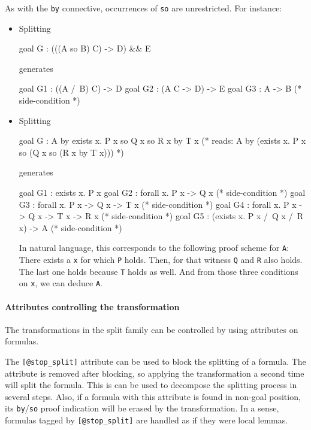 \begin{description}
As with the \texttt{by} connective, occurrences of \texttt{so} are
unrestricted. For instance:
\begin{itemize}
\item Splitting
\begin{whycode}
goal G : (((A so B) \/ C) -> D) && E
\end{whycode}
generates
\begin{whycode}
goal G1 : ((A /\ B) \/ C) -> D
goal G2 : (A \/ C -> D) -> E
goal G3 : A -> B               (* side-condition *)
\end{whycode}
\item Splitting
\begin{whycode}
goal G : A by exists x. P x so Q x so R x by T x
(* reads: A by (exists x. P x so (Q x so (R x by T x))) *)
\end{whycode}
generates
\begin{whycode}
goal G1 : exists x. P x
goal G2 : forall x. P x -> Q x               (* side-condition *)
goal G3 : forall x. P x -> Q x -> T x        (* side-condition *)
goal G4 : forall x. P x -> Q x -> T x -> R x (* side-condition *)
goal G5 : (exists x. P x /\ Q x /\ R x) -> A (* side-condition *)
\end{whycode}
In natural language, this corresponds to the following proof scheme
for \verb|A|: There exists a \verb|x| for which \verb|P| holds. Then,
for that witness \verb|Q| and \verb|R| also holds. The last one holds
because \verb|T| holds as well. And from those three conditions on
\verb|x|, we can deduce \verb|A|.
\end{itemize}

\paragraph{Attributes controlling the transformation}

The transformations in the split family can be controlled by using
attributes on formulas.

The \verb|[@stop_split]| attribute can be used to block the splitting of a
formula.  The attribute is removed after blocking, so applying the
transformation a second time will split the formula. This is can be
used to decompose the splitting process in several steps. Also, if a
formula with this attribute is found in non-goal position, its
\texttt{by}/\texttt{so} proof indication will be erased by the
transformation. In a sense, formulas tagged by \verb|[@stop_split]| are
handled as if they were local lemmas.


\end{description}
